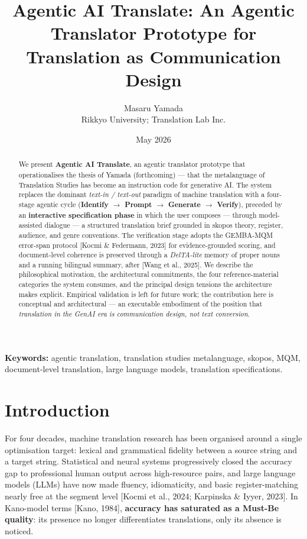 \documentclass[11pt]{article}
\title{Agentic AI Translate: An Agentic Translator Prototype for Translation as Communication Design}
\author{Masaru Yamada\\Rikkyo University; Translation Lab Inc.}
\date{May 2026}
\begin{document}
\maketitle

\begin{abstract}
We present \textbf{Agentic AI Translate}, an agentic translator prototype that operationalises the thesis of Yamada (forthcoming) --- that the metalanguage of Translation Studies has become an instruction code for generative AI. The system replaces the dominant \emph{text-in / text-out} paradigm of machine translation with a four-stage agentic cycle (\textbf{Identify $\rightarrow$ Prompt $\rightarrow$ Generate $\rightarrow$ Verify}), preceded by an \textbf{interactive specification phase} in which the user composes --- through model-assisted dialogue --- a structured translation brief grounded in skopos theory, register, audience, and genre conventions. The verification stage adopts the GEMBA-MQM error-span protocol [Kocmi \& Federmann, 2023] for evidence-grounded scoring, and document-level coherence is preserved through a \emph{DelTA-lite} memory of proper nouns and a running bilingual summary, after [Wang et al., 2025]. We describe the philosophical motivation, the architectural commitments, the four reference-material categories the system consumes, and the principal design tensions the architecture makes explicit. Empirical validation is left for future work; the contribution here is conceptual and architectural --- an executable embodiment of the position that \emph{translation in the GenAI era is communication design, not text conversion}.
\end{abstract}

\noindent\textbf{Keywords:} agentic translation, translation studies metalanguage, skopos, MQM, document-level translation, large language models, translation specifications.

\section{Introduction}

For four decades, machine translation research has been organised around a single optimisation target: lexical and grammatical fidelity between a source string and a target string. Statistical and neural systems progressively closed the accuracy gap to professional human output across high-resource pairs, and large language models (LLMs) have now made fluency, idiomaticity, and basic register-matching nearly free at the segment level [Kocmi et al., 2024; Karpinska \& Iyyer, 2023]. In Kano-model terms [Kano, 1984], \textbf{accuracy has saturated as a Must-Be quality}: its presence no longer differentiates translations, only its absence is noticed.
\end{document}
